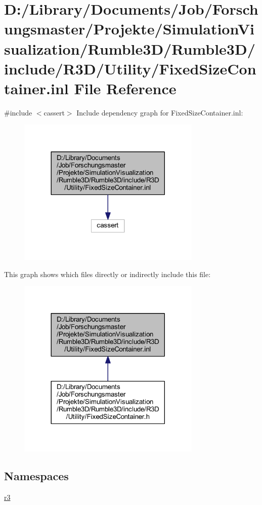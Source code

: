 \hypertarget{_fixed_size_container_8inl}{}\section{D\+:/\+Library/\+Documents/\+Job/\+Forschungsmaster/\+Projekte/\+Simulation\+Visualization/\+Rumble3\+D/\+Rumble3\+D/include/\+R3\+D/\+Utility/\+Fixed\+Size\+Container.inl File Reference}
\label{_fixed_size_container_8inl}
{\ttfamily \#include $<$cassert$>$}\newline
Include dependency graph for Fixed\+Size\+Container.\+inl\+:\nopagebreak
\begin{figure}[H]
\begin{center}
\leavevmode
\includegraphics[width=248pt]{_fixed_size_container_8inl__incl}
\end{center}
\end{figure}
This graph shows which files directly or indirectly include this file\+:\nopagebreak
\begin{figure}[H]
\begin{center}
\leavevmode
\includegraphics[width=248pt]{_fixed_size_container_8inl__dep__incl}
\end{center}
\end{figure}
\subsection*{Namespaces}
\begin{DoxyCompactItemize}
\item 
 \mbox{\hyperlink{namespacer3}{r3}}
\end{DoxyCompactItemize}
